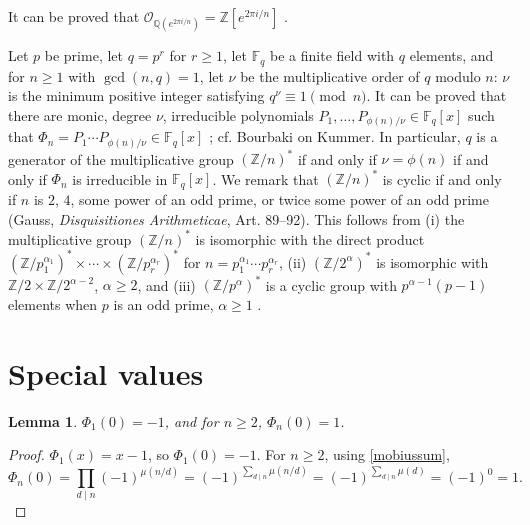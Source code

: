 \documentclass{amsart}
\newtheorem{lemma}[theorem]{Lemma}
\theoremstyle{definition}
\begin{document}
It can be proved that $\mathcal{O}_{\mathbb{Q}(e^{2\pi i/n})} = \mathbb{Z}[e^{2\pi i/n}]$ \cite[p.~60, Proposition 10.2]{neukirch}.







Let $p$ be prime, let $q=p^r$ for $r \geq 1$,  let $\mathbb{F}_q$ be a finite field with $q$ elements,
and for $n \geq 1$ with $\gcd(n,q)=1$, let $\nu$ be the multiplicative order of $q$ modulo $n$: $\nu$ is the minimum positive
integer satisfying $q^\nu \equiv 1 \pmod{n}$. It can be proved that
there are monic, degree $\nu$, irreducible polynomials
$P_1,\ldots,P_{\phi(n)/\nu} \in \mathbb{F}_q[x]$ such that
$\Phi_n = P_1 \cdots P_{\phi(n)/\nu} \in \mathbb{F}_q[x]$ \cite[p.~65, Theorem 2.47]{lidl}; cf.
Bourbaki \cite[p.~581]{commutative} on Kummer.
In particular, $q$ is a generator of the multiplicative group $(\mathbb{Z}/n)^*$ if and only if
$\nu=\phi(n)$ if and only if $\Phi_n$ is irreducible in $\mathbb{F}_q[x]$. We remark that $(\mathbb{Z}/n)^*$ is cyclic if and only if
$n$ is $2$, $4$, some power of an odd prime, or twice some power of an odd prime (Gauss, {\em Disquisitiones Arithmeticae}, Art. 89--92).
This 
 follows from (i) the multiplicative group $(\mathbb{Z}/n)^*$ is isomorphic with the direct product
$(\mathbb{Z}/p_1^{\alpha_1})^* \times \cdots \times (\mathbb{Z}/p_r^{\alpha_r})^*$ for $n=p_1^{\alpha_1} \cdots p_r^{\alpha_r}$,
(ii) $(\mathbb{Z}/2^\alpha)^*$ is isomorphic with $\mathbb{Z}/2 \times \mathbb{Z}/2^{\alpha-2}$, $\alpha \geq 2$,
and (iii) $(\mathbb{Z}/p^\alpha)^*$ is a cyclic group with $p^{\alpha-1}(p-1)$ elements when $p$ is an odd
prime, $\alpha \geq 1$ \cite[p.~314, Corollary 20]{dummit}.








\section{Special values}
\begin{lemma}
$\Phi_1(0)=-1$, and for $n \geq 2$, $\Phi_n(0)=1$.
\label{Phi0}
\end{lemma}
\begin{proof}
$\Phi_1(x)=x-1$, so $\Phi_1(0)=-1$. For $n \geq 2$, using \eqref{mobiussum},
\[
\Phi_n(0) = \prod_{d \mid n} (-1)^{\mu(n/d)} = (-1)^{\sum_{d \mid n} \mu(n/d)} = (-1)^{\sum_{d \mid n} \mu(d)}
=(-1)^0 = 1.
\]
\end{proof}
\end{document}
